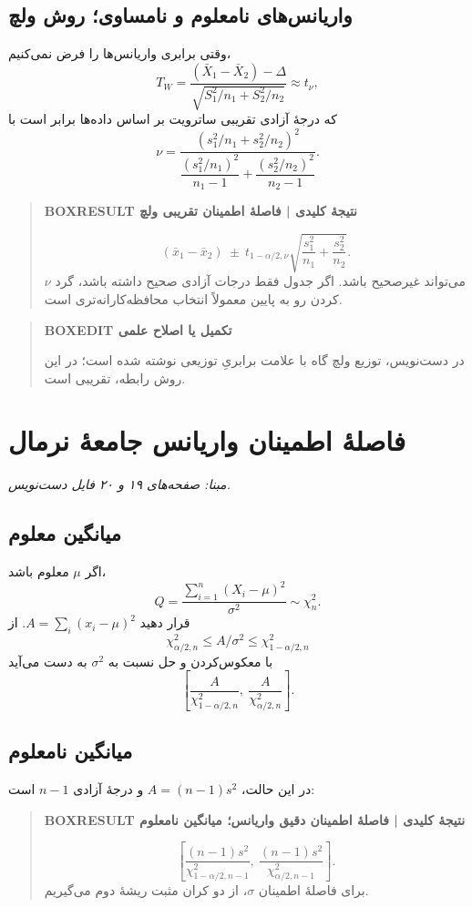 \subsection{واریانس‌های نامعلوم و نامساوی؛ روش ولچ}
وقتی برابری واریانس‌ها را فرض نمی‌کنیم،
\[
T_W=\frac{(\bar X_1-\bar X_2)-\Delta}
{\sqrt{S_1^2/n_1+S_2^2/n_2}}
\approx t_\nu,
\]
که درجهٔ آزادی تقریبی ساترویت بر اساس داده‌ها برابر است با
\[
\nu=\frac{(s_1^2/n_1+s_2^2/n_2)^2}
{\dfrac{(s_1^2/n_1)^2}{n_1-1}+\dfrac{(s_2^2/n_2)^2}{n_2-1}}.
\]
\begin{quote}\textbf{BOXRESULT نتیجهٔ کلیدی | فاصلهٔ اطمینان تقریبی ولچ}\par 
\[
\boxed{(\bar x_1-\bar x_2)\ \pm\ t_{1-\alpha/2,\nu}
\sqrt{\frac{s_1^2}{n_1}+\frac{s_2^2}{n_2}}.}
\]
$\nu$ می‌تواند غیرصحیح باشد. اگر جدول فقط درجات آزادی صحیح داشته باشد، گرد کردن رو به پایین معمولاً انتخاب محافظه‌کارانه‌تری است.
\end{quote}
\begin{quote}\textbf{BOXEDIT تکمیل یا اصلاح علمی}\par در دست‌نویس، توزیع ولچ گاه با علامت برابریِ توزیعی نوشته شده است؛ در این روش رابطه، تقریبی است.\end{quote}
\section{فاصلهٔ اطمینان واریانس جامعهٔ نرمال}
\textit{مبنا: صفحه‌های ۱۹ و ۲۰ فایل دست‌نویس.}\par 
\subsection{میانگین معلوم}
اگر $\mu$ معلوم باشد،
\[
Q=\frac{\sum_{i=1}^n(X_i-\mu)^2}{\sigma^2}\sim\chi^2_n.
\]
قرار دهید $A=\sum_i(x_i-\mu)^2$. از
\[\chi^2_{\alpha/2,n}\le A/\sigma^2\le\chi^2_{1-\alpha/2,n}\]
با معکوس‌کردن و حل نسبت به $\sigma^2$ به دست می‌آید
\[
\boxed{\left[\frac{A}{\chi^2_{1-\alpha/2,n}},\
\frac{A}{\chi^2_{\alpha/2,n}}\right].}
\]
\subsection{میانگین نامعلوم}
در این حالت، $A=(n-1)s^2$ و درجهٔ آزادی $n-1$ است:
\begin{quote}\textbf{BOXRESULT نتیجهٔ کلیدی | فاصلهٔ اطمینان دقیق واریانس؛ میانگین نامعلوم}\par 
\[
\boxed{\left[\frac{(n-1)s^2}{\chi^2_{1-\alpha/2,n-1}},\
\frac{(n-1)s^2}{\chi^2_{\alpha/2,n-1}}\right].}
\]
برای فاصلهٔ اطمینان $\sigma$، از دو کران مثبت ریشهٔ دوم می‌گیریم.
\end{quote}



